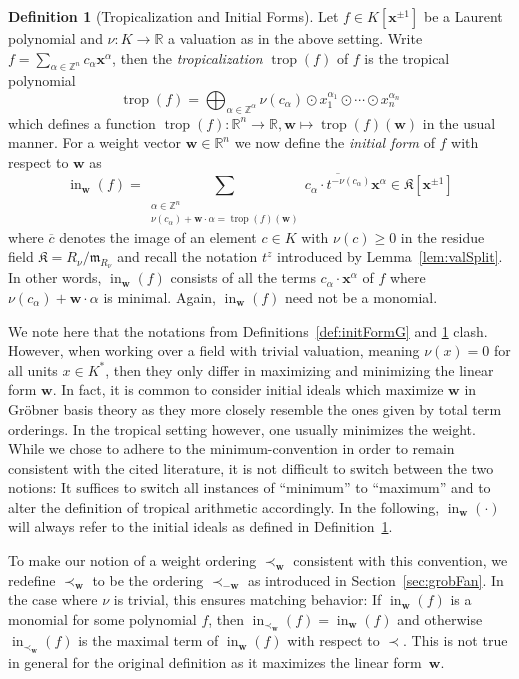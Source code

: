 \documentclass[
  paper=a4,
  titlepage,
  bibliography=totoc,
  pagesize=pdftex
]{scrartcl}
\numberwithin{figure}{section}
\numberwithin{equation}{section}
\numberwithin{table}{section}
\newcommand*\setZ{\mathds{Z}}
\newcommand*\setR{\mathds{R}}
\let\vec\mathbf
\DeclareMathOperator{\trop}{trop}
\DeclareMathOperator{\initial}{in}
\theoremstyle{definition}
\newtheorem{definition}{Definition}
\numberwithin{definition}{section}
\begin{document}
\begin{definition}[Tropicalization and Initial Forms]
  \label{def:initialId}
  Let $f \in K[\vec x^{\pm1}]$ be a Laurent polynomial and $\nu : K \to \setR$ a valuation
  as in the above setting. Write $f = \sum_{\alpha \in \setZ^n} c_\alpha \vec x^\alpha$,
  then the \emph{tropicalization} $\trop(f)$ of $f$ is the tropical polynomial
  \[
    \trop(f) = \bigoplus_{\alpha\in\setZ^\alpha} \nu(c_\alpha)
    \odot x_1^{\alpha_1}\odot\cdots \odot x_n^{\alpha_n}
  \]
  which defines a function $\trop(f) : \setR^n \to \setR, \vec w \mapsto \trop(f)(\vec w)$
  in the usual manner. For a weight vector $\vec w \in \setR^n$ we now define the
  \emph{initial form} of $f$ with respect to $\vec w$ as
  \[
    \initial_{\vec w}(f) =
    \sum_{ \substack{
        \alpha \in \setZ^n \\
        \nu(c_\alpha) + \vec w\cdot \alpha = \trop(f)(\vec w)
    }} \overline {c_\alpha \cdot t^{-\nu(c_\alpha)} } \vec x^\alpha
    \in \mathfrak K[\vec x^{\pm1}]
  \]
  where $\overline{c}$ denotes the image of an element $c \in K$ with $\nu(c)\geq0$ in the
  residue field $\mathfrak K = R_\nu/\mathfrak m_{R_\nu}$ and recall the notation $t^z$
  introduced by Lemma~\ref{lem:valSplit}. In other words, $\initial_{\vec w}(f)$ consists
  of all the terms $c_\alpha\cdot \vec x^\alpha$ of $f$ where $\nu(c_\alpha)+\vec w\cdot
  \alpha$ is minimal. Again, $\initial_{\vec w}(f)$ need not be a monomial.
\end{definition}

We note here that the notations from Definitions~\ref{def:initFormG} and
\ref{def:initialId} clash. However, when working over a field with trivial valuation,
meaning $\nu(x) = 0$ for all units $x \in K^*$, then they only differ in maximizing and
minimizing the linear form $\vec w$. In fact, it is common to consider initial ideals
which maximize $\vec w$ in Gröbner basis theory as they more closely resemble the ones
given by total term orderings. In the tropical setting however, one usually minimizes
the weight. While we chose to adhere to the minimum-convention in order to remain
consistent with the cited literature, it is not difficult to switch between the two
notions: It suffices to switch all instances of \enquote{minimum} to \enquote{maximum} and
to alter the definition of tropical arithmetic accordingly. In the following,
$\initial_{\vec w}(\cdot)$ will always refer to the initial ideals as defined in
Definition~\ref{def:initialId}.

To make our notion of a weight ordering $\prec_{\vec w}$ consistent with this convention,
we redefine $\prec_{\vec w}$ to be the ordering $\prec_{-\vec w}$ as introduced in
Section~\ref{sec:grobFan}. In the case where $\nu$ is trivial, this ensures matching
behavior: If $\initial_{\vec w}(f)$ is a monomial for some polynomial $f$, then
$\initial_{\prec_{\vec w}}(f) = \initial_{\vec w}(f)$ and otherwise $\initial_{\prec_{\vec
w}}(f)$ is the maximal term of $\initial_{\vec w}(f)$ with respect to $\prec$. This is not
true in general for the original definition as it maximizes the linear form~$\vec w$.
\end{document}
